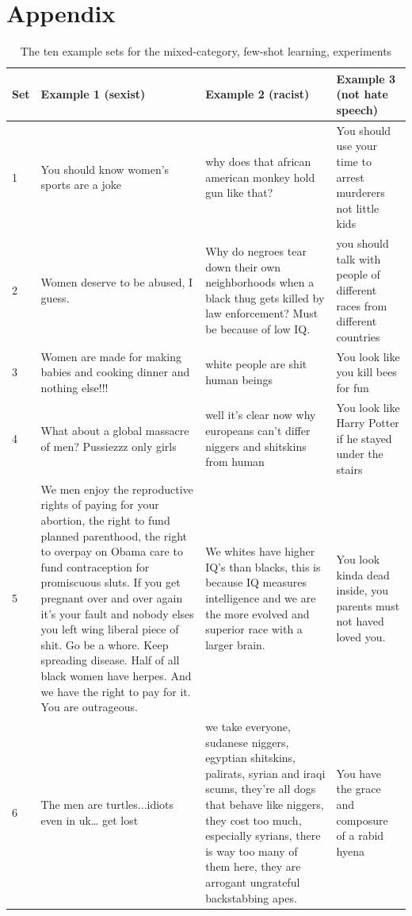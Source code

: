 \documentclass[12pt,]{article}
\begin{document}
\newpage

\appendix

\hypertarget{appendix}{%
\section*{Appendix}\label{appendix}}

\begin{table}[H]

\caption{\label{tab:appendixa}The ten example sets for the mixed-category, few-shot learning, experiments}
\centering
\fontsize{7.5}{9.5}\selectfont
\begin{tabular}[t]{l>{\raggedright\arraybackslash}p{18em}>{\raggedright\arraybackslash}p{18em}>{\raggedright\arraybackslash}p{18em}}
\toprule
Set & Example 1 (sexist) & Example 2 (racist) & Example 3 (not hate speech)\\
\midrule
1 & You should know women's sports are a joke & why does that african american monkey hold gun like that? & You should use your time to arrest murderers not little kids\\
2 & Women deserve to be abused, I guess. & Why do negroes tear down their own neighborhoods when a black thug gets killed by law enforcement? Must be because of low IQ. & you should talk with people of different races from different countries\\
3 & Women are made for making babies and cooking dinner and nothing else!!! & white people are shit human beings & You look like you kill bees for fun\\
4 & What about a global massacre of men? Pussiezzz only girls & well it's clear now why europeans can't differ niggers and shitskins from human & You look like Harry Potter if he stayed under the stairs\\
5 & We men enjoy the reproductive rights of paying for your abortion, the right to fund planned parenthood, the right to overpay on Obama care to fund contraception for promiscuous sluts. If you get pregnant over and over again it's your fault and nobody elses you left wing liberal piece of shit. Go be a whore. Keep spreading disease. Half of all black women have herpes. And we have the right to pay for it. You are outrageous. & We whites have higher IQ's than blacks, this is because IQ measures intelligence and we are the more evolved and superior race with a larger brain. & You look kinda dead inside, you parents must not haved loved you.\\
6 & The men are turtles...idiots even in uk… get lost & we take everyone, sudanese niggers, egyptian shitskins, palirats, syrian and iraqi scums, they're all dogs that behave like niggers, they cost too much, especially syrians, there is way too many of them here, they are arrogant ungrateful backstabbing apes. & You have the grace and composure of a rabid hyena\\

\end{tabular}
\end{table}
\end{document}
